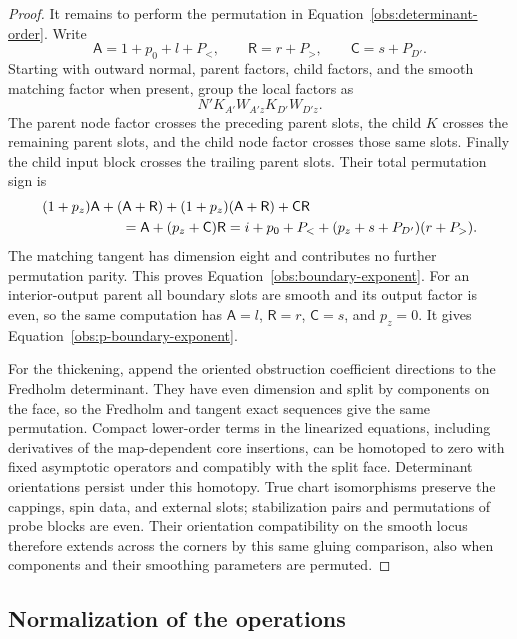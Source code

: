 \begin{proof}
It remains to perform the permutation in
Equation~\eqref{obs:determinant-order}.  Write
\[
 \mathsf A=1+p_0+l+P_<,\qquad
 \mathsf R=r+P_>,\qquad \mathsf C=s+P_{D'}.
\]
Starting with outward normal, parent factors, child factors, and
the smooth matching factor when present, group the local factors as
\[
 N'K_{A'}W_{A'z}K_{D'}W_{D'z}.
\]
The parent node factor crosses the preceding parent slots, the
child $K$ crosses the remaining parent slots, and the child node
factor crosses those same slots.  Finally the child input block
crosses the trailing parent slots.  Their total permutation sign is
\begin{align*}
 &(1+p_z)\mathsf A+(\mathsf A+\mathsf R)
       +(1+p_z)(\mathsf A+\mathsf R)+\mathsf C\mathsf R\\
 &\hspace{20mm}=\mathsf A+(p_z+\mathsf C)\mathsf R
   =i+p_0+P_<+(p_z+s+P_{D'})(r+P_>).
\end{align*}
The matching tangent has dimension eight and contributes no further
permutation parity.  This proves
Equation~\eqref{obs:boundary-exponent}.  For an interior-output
parent all boundary slots are smooth and its output factor is
even, so the same computation has $\mathsf A=l$, $\mathsf R=r$,
$\mathsf C=s$, and
$p_z=0$.  It gives Equation~\eqref{obs:p-boundary-exponent}.

For the thickening, append the oriented obstruction coefficient
directions to the Fredholm determinant.  They have even dimension
and split by components on the face, so the Fredholm and tangent
exact sequences give the same permutation.  Compact lower-order
terms in the linearized equations, including derivatives of the
map-dependent core insertions, can be homotoped to zero with fixed
asymptotic operators and compatibly with the split face.
Determinant orientations persist under this homotopy.  True chart
isomorphisms preserve the cappings, spin data, and external slots;
stabilization pairs and permutations of probe blocks are even.
Their orientation compatibility on the smooth locus therefore
extends across the corners by this same gluing comparison, also
when components and their smoothing parameters are permuted.
\end{proof}

\subsection{Normalization of the operations}

